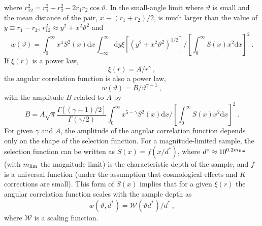 \documentclass[12pt,a4paper]{article}
\newcommand{\dif}{\mathrm{d}}
\begin{document}
where $r_{12}^2 = r_1^2 + r_2^2 − 2r_1 r_2 \cos \vartheta$. In the small-angle limit where $\vartheta$ is small and the mean distance of the pair, $x \equiv (r_1 +r_2)/2$, is much larger than the value of $y \equiv r_1 -r_2$, $r_{12}^2 \approx y^2 +x^2 \vartheta^2$ and 
\begin{equation}
w(\vartheta) = \int_0^\infty x^4 S^2(x) \dif x \int_{-\infty}^\infty \dif y \xi \left[(y^2 +x^2 \vartheta^2)^{1/2} \right] \Bigg/ \left[\int_0^\infty S(x) x^2 \dif x \right]^2 ~.
\end{equation}
If $\xi(r)$ is a power law,
\begin{equation}
\xi(r) = A/r^\gamma ~,
\end{equation}
the angular correlation function is also a power law,
\begin{equation}
w(\vartheta) = B/\vartheta^{\gamma -1} ~,
\end{equation}
with the amplitude $B$ related to $A$ by
\begin{equation}
B = A \sqrt{\pi} \dfrac{\Gamma[(\gamma-1)/2]}{\Gamma(\gamma/2)} \int_0^\infty x^{5-\gamma} S^2(x) \dif x \Bigg/ \left[\int_0^\infty S(x) x^2 \dif x \right]^2 ~.
\end{equation}
For given $\gamma$ and $A$, the amplitude of the angular correlation function depends only on the shape of the selection function. For a magnitude-limited sample, the selection function can be written as $S(x) = f(x/d^\ast)$, where $d^\ast \approx 10^{0.2 m_{\rm lim}}$ (with $m_{\rm lim}$ the magnitude limit) is the characteristic depth of the sample, and $f$ is a universal function (under the assumption that cosmological effects and $K$ corrections are small). This form of $S(x)$ implies that for a given $\xi(r)$ the angular correlation function scales with the sample depth as
\begin{equation}
w(\vartheta, d^\ast) = \mathscr W(\vartheta d^\ast)/d^\ast ~,
\end{equation}
where $\mathscr W$ is a scaling function.
\end{document}
